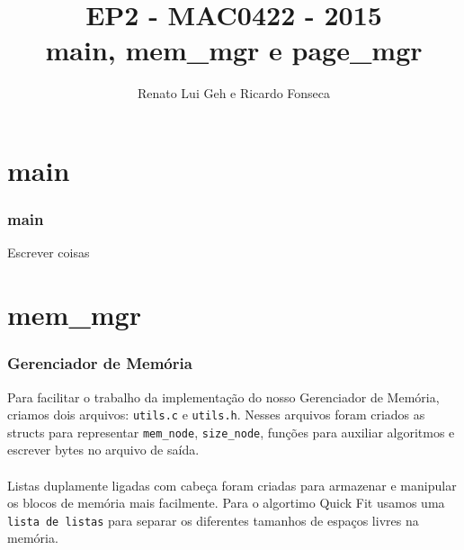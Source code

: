 \documentclass{beamer}
\title[EP2 - MAC0422]{EP2 - MAC0422 - 2015 \\
                      main, mem_mgr e page_mgr} %
\author{Renato Lui Geh e Ricardo Fonseca}
\date{}
\begin{document}
\begin{frame}
  \titlepage %
\end{frame}



\section{main} %

\begin{frame}
  \frametitle{main}
  Escrever coisas
\end{frame}

\section{mem_mgr}

\begin{frame}
  \frametitle{Gerenciador de Memória}
  Para facilitar o trabalho da implementação do nosso Gerenciador de Memória, criamos dois arquivos: \texttt{utils.c} e \texttt{utils.h}. Nesses arquivos foram criados as structs para representar \texttt{mem_node}, \texttt{size_node}, funções para auxiliar algoritmos e escrever bytes no arquivo de saída. \\~\\

  Listas duplamente ligadas com cabeça foram criadas para armazenar e manipular os blocos de memória mais facilmente. Para o algortimo Quick Fit usamos uma \texttt{lista de listas} para separar os diferentes tamanhos de espaços livres na memória.
\end{frame}

\end{document}
